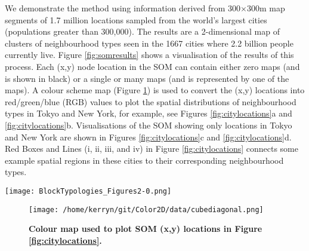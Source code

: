 \documentclass[9pt,twocolumn,twoside,lineno]{pnas-new}
\begin{document}
We demonstrate the method using information derived from 300$\times$300m map segments of 1.7 million locations sampled from the world's largest cities (populations greater than 300,000). The results are a 2-dimensional map of clusters of neighbourhood types seen in the 1667 cities where 2.2 billion people currently live. Figure \ref{fig:somresults} shows a visualisation of the results of this process. Each (x,y) node location in the SOM can contain either zero maps (and is shown in black) or a single or many maps (and is represented by one of the maps). A colour scheme map (Figure \ref{fig:colormap}) is used to convert the (x,y) locations into red/green/blue (RGB) values to plot the spatial distributions of neighbourhood types in Tokyo and New York, for example, see Figures \ref{fig:citylocations}a and \ref{fig:citylocations}b. Visualisations of the SOM showing only locations in Tokyo and New York are shown in Figures \ref{fig:citylocations}c and \ref{fig:citylocations}d. Red Boxes and Lines (i, ii, iii, and iv) in Figure \ref{fig:citylocations} connects some example spatial regions in these cities to their corresponding neighbourhood types.

\begin{figure*}
\centering
\texttt{[image: BlockTypologies\_Figures2-0.png]}
\caption{\bf A visualisation of the 2-dimensional 100$\times$100 SOM trained with 1.7 million map images from 1667 cities. Each (x,y) point shows a representative image associated with each node while nodes without associated images are shown in black. Border shows colour coding scheme (Figure \ref{fig:colormap}) for SOM (x,y) locations used in Figure \ref{fig:citylocations}.}
 \label{fig:somresults}
\end{figure*}












\begin{figure}
\centering
\texttt{[image: /home/kerryn/git/Color2D/data/cubediagonal.png]}
\caption{\bf Colour map used to plot SOM (x,y) locations in Figure \ref{fig:citylocations}. }
 \label{fig:colormap}
\end{figure} 
\end{document}
